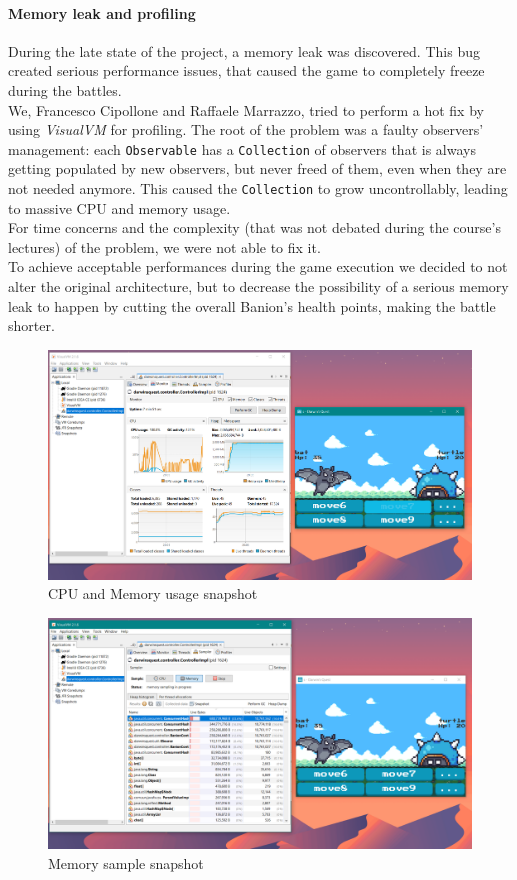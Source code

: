 \documentclass[12pt, a4paper]{report}
\theoremstyle{definition}
\begin{document}
    \paragraph{Memory leak and profiling}
    During the late state of the project, a memory leak was discovered. This bug created serious performance issues, that caused the game to completely freeze
    during the battles.\\
    We, Francesco Cipollone and Raffaele Marrazzo, tried to perform a hot fix by using \textit{VisualVM} for profiling.
    The root of the problem was a faulty observers' management: each \verb|Observable| has a \verb|Collection| of observers that is always getting populated by
    new observers, but never freed of them, even when they are not needed anymore. This caused the \verb|Collection| to grow uncontrollably, leading to massive
    CPU and memory usage.\\
    For time concerns and the complexity (that was not debated during the course's lectures) of the problem, we were not able to fix it.\\
    To achieve acceptable performances during the game execution we decided to not alter the original architecture, but to decrease the possibility
    of a serious memory leak to happen by cutting the overall Banion's health points, making the battle shorter.

    \begin{figure}[H]
    \centering{}
    \caption{CPU and Memory usage snapshot}
    \includegraphics[width=\textwidth]{profiling1}
    \end{figure}

    \begin{figure}[H]
    \centering{}
    \caption{Memory sample snapshot}
    \includegraphics[width=\textwidth]{profiling2}
    \end{figure}
\end{document}
